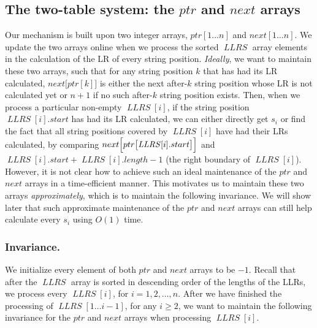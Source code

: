\documentclass[preprint]{elsarticle}
\newtheorem{definition}{Definition}[section]
\newcommand{\remove}[1]{}
\DeclareMathOperator{\llrs}{\mathit{LLRS}}
\begin{document}
\subsection{The two-table system: the $ptr$ and $next$ arrays}
\remove{
\begin{definition}
  \label{def:alpha-k}
  For any string position $k$ that has had its LR calculated during
  the run of Algorithm~\ref{algo:concept}, we use $\alpha_k$ to denote
  the first string position that is after $k$ and has not had its LR
  calculated, if such string position exists; otherwise, we set
  $\alpha_k = n+1$, where $n$ is the length of the string $S$.
\end{definition}
}


Our mechanism is built upon two integer arrays, $ptr[1\ldots n]$ and
$next[1\ldots n]$.  We
update the two arrays online when we process the sorted $\llrs$ array
elements in the calculation of the LR of every string position.
\emph{Ideally}, we want to maintain these two arrays, such that for
any string position $k$ that has had its LR calculated,
$next\bigl[ptr[k]\bigr]$ is either the next after-$k$ string position
whose LR is not calculated yet or $n+1$ if no such after-$k$ string
position exists.  Then, when we process a particular non-empty
$\llrs[i]$, if the string position $\llrs[i].start$ has had its LR
calculated, we can either directly get $s_i$ or find the fact that all
string positions covered by $\llrs[i]$ have had their LRs calculated,
by comparing $next\Bigl[ptr\bigl[\llrs[i].start\bigr]\Bigr]$ and
$\llrs[i].start+\llrs[i].length-1$ (the right boundary of $\llrs[i]$).
However, it is not clear how to achieve such an ideal maintenance of
the $ptr$ and $next$ arrays in a time-efficient manner. This motivates
us to maintain these two arrays \emph{approximately}, which is to
maintain the following invariance. We will show later that such
approximate maintenance of the $ptr$ and $next$ arrays can still help
calculate every $s_i$ using $O(1)$ time.

\subsubsection{Invariance.}
We initialize every element of both $ptr$ and $next$ arrays to be $-1$.
Recall that after the $\llrs$ array
is sorted in descending order of the lengths of the LLRs, we process
every $\llrs[i]$, for $i=1,2,\ldots,n$. After we have finished the
processing of $\llrs[1\ldots i-1]$, for any $i\geq 2$, we want to
maintain the following invariance for the $ptr$ and $next$ arrays when processing $\llrs[i]$.
\end{document}
